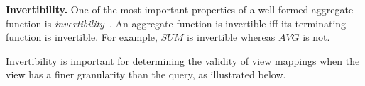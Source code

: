 
\textbf{Invertibility.} 
One of the most important properties of a well-formed aggregate function is {\em invertibility}~\cite{cohen2006user}. An aggregate function is invertible iff its terminating function is invertible.  For example, $SUM$ is invertible whereas $AVG$ is not.

Invertibility is important for determining the validity of view mappings when the view has a finer granularity than the query, as illustrated below.

